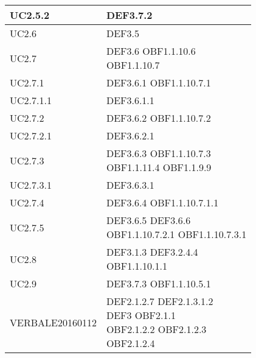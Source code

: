 \documentclass{scalatekids-article}
\begin{document}
\begin{longtable}[H]{|p{5.5cm}|p{5.5cm}|}
  \hline
  UC2.5.2 & \multiLineCell[t]{DEF3.7.2\\}\\
  \hline
  UC2.6 & \multiLineCell[t]{DEF3.5\\}\\
  \hline
  UC2.7 & \multiLineCell[t]{DEF3.6 OBF1.1.10.6\\OBF1.1.10.7\\}\\
  \hline
  UC2.7.1 & \multiLineCell[t]{DEF3.6.1 OBF1.1.10.7.1\\}\\
  \hline
  UC2.7.1.1 & \multiLineCell[t]{DEF3.6.1.1\\}\\
  \hline
  UC2.7.2 & \multiLineCell[t]{DEF3.6.2 OBF1.1.10.7.2\\}\\
  \hline
  UC2.7.2.1 & \multiLineCell[t]{DEF3.6.2.1\\}\\
  \hline
  UC2.7.3 & \multiLineCell[t]{DEF3.6.3 OBF1.1.10.7.3\\OBF1.1.11.4 OBF1.1.9.9\\}\\
  \hline
  UC2.7.3.1 & \multiLineCell[t]{DEF3.6.3.1\\}\\
  \hline
  UC2.7.4 & \multiLineCell[t]{DEF3.6.4 OBF1.1.10.7.1.1\\}\\
  \hline
  UC2.7.5 & \multiLineCell[t]{DEF3.6.5 DEF3.6.6\\OBF1.1.10.7.2.1 OBF1.1.10.7.3.1\\}\\
  \hline
  UC2.8 & \multiLineCell[t]{DEF3.1.3 DEF3.2.4.4\\OBF1.1.10.1.1\\}\\
  \hline
  UC2.9 & \multiLineCell[t]{DEF3.7.3 OBF1.1.10.5.1\\}\\
  \hline
  VERBALE20160112 & \multiLineCell[t]{DEF2.1.2.7 DEF2.1.3.1.2\\DEF3 OBF2.1.1\\OBF2.1.2.2 OBF2.1.2.3\\OBF2.1.2.4\\}\\
  \hline
\end{longtable}






\end{document}
